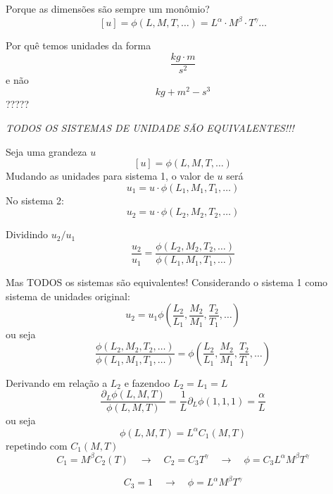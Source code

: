 \documentclass{beamer}
\newcommand{\lra}{\ensuremath{\longrightarrow}}
\newcommand{\qrq}{\ensuremath{\quad\lra\quad}}
\begin{document}
\begin{frame}{Porque as dimensões são sempre um monômio?}
  \[
  [u] = \phi(L,M,T,\ldots) = L^\alpha\cdot M^\beta\cdot T^\gamma\ldots
  \]

  Por quê temos unidades da forma
  \[
  \frac{kg\cdot m}{s^2}
  \]
  e não
  \[
  kg + m^2 - s^3
  \]
  ?????

  \emph{TODOS OS SISTEMAS DE UNIDADE SÃO EQUIVALENTES!!!}
\end{frame}

\begin{frame}{Seja uma grandeza $u$}
  \[
[u] = \phi\left( L, M, T, \ldots\right)
\]
Mudando as unidades para sistema 1, o valor de $u$ será
\[
u_1 = u\cdot\phi\left(L_1, M_1, T_1, \ldots\right)
\]
No sistema 2:
\[
u_2 = u\cdot\phi\left(L_2, M_2, T_2, \ldots\right)
\]

Dividindo $u_2/u_1$
\[
\frac{u_2}{u_1} = \frac{ \phi\left(L_2, M_2, T_2, \ldots\right) }{ \phi\left(L_1, M_1, T_1, \ldots\right) }
\]

  
\end{frame}

\begin{frame}{Mas TODOS os sistemas são equivalentes!}
  Considerando o sistema 1 como sistema de unidades original:
  \[
  u_2 = u_1\phi\left(\frac{L_2}{L_1}, \frac{M_2}{M_1}, \frac{T_2}{T_1}, \ldots \right)
\]
ou seja
\[
\frac{ \phi\left(L_2, M_2, T_2, \ldots\right) }{ \phi\left(L_1, M_1, T_1, \ldots\right) } = \phi\left(\frac{L_2}{L_1}, \frac{M_2}{M_1}, \frac{T_2}{T_1}, \ldots \right)
\]
\end{frame}


\begin{frame}{Derivando em relação a $L_2$ e fazendoo $L_2=L_1=L$}
  \[
\frac{\partial_L\phi(L,M,T)}{\phi(L,M,T)} =  \frac{1}{L}\partial_L\phi(1,1,1) = \frac{\alpha}{L} 
\]
ou seja
\[
\phi(L,M,T) = L^\alpha C_1(M,T)
\]
repetindo com $C_1(M,T)$
\[
C_1 = M^\beta C_2(T) \qrq C_2 = C_3T^\gamma\qrq \phi = C_3 L^\alpha M^\beta T^\gamma
\]

\[
C_3 = 1\qrq \phi = L^\alpha M^\beta T^\gamma
\]
\end{frame}
\end{document}

